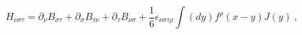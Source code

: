 \begin{equation}
H_{\nu \sigma \tau }=\partial _{\nu }B_{\sigma \tau }+\partial _{\sigma
}B_{\tau \nu }+\partial _{\tau }B_{\nu \sigma }+\frac{1}{6}\epsilon _{\nu
\sigma \tau \rho }\int (dy)f^{\rho }(x-y)J(y)\ ,  \label{GENSOL}
\end{equation}%
